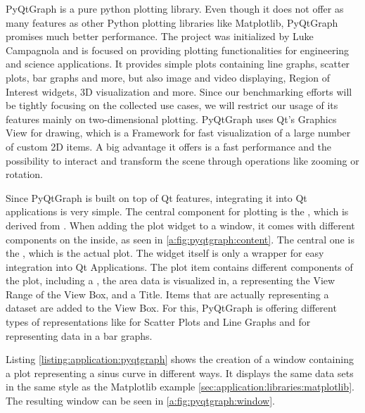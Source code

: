 PyQtGraph is a pure python plotting library. Even though it does not offer as
many features as other Python plotting libraries like Matplotlib, PyQtGraph
promises much better performance. The project was initialized by Luke Campagnola
and is focused on providing plotting functionalities for engineering and science
applications. It provides simple plots containing line graphs, scatter plots,
bar graphs and more, but also image and video displaying, Region of Interest
widgets, 3D visualization and more.  Since our benchmarking efforts will be
tightly focusing on the collected use cases, we will restrict our usage of its
features mainly on two-dimensional plotting. PyQtGraph uses Qt's Graphics View
for drawing, which is a Framework for fast visualization of a large number of
custom 2D items. A big advantage it offers is a fast performance and the
possibility to interact and transform the scene through operations like
zooming or rotation.
\cite{GraphicsView}

Since PyQtGraph is built on top of Qt features, integrating it into Qt
applications is very simple. The central component for plotting is the
, which is derived from
. When adding the plot widget to a
window, it comes with different components on the inside, as seen in
\ref{a:fig:pyqtgraph:content}. The central one is the
, which is the actual plot. The widget
itself is only a wrapper for easy integration into Qt Applications. The plot
item contains different components of the plot, including a
, the area data is visualized in,
a  representing the View Range
of the View Box, and a Title. Items that are actually representing a dataset are
added to the View Box. For this, PyQtGraph is offering different types of
representations like  for Scatter
Plots and Line Graphs and  for
representing data in a bar graphs.

Listing \ref{listing:application:pyqtgraph} shows the creation of a window
containing a plot representing a sinus curve in different ways. It displays the
same data sets in the same style as the Matplotlib example
\ref{sec:application:libraries:matplotlib}. The resulting window can be seen in
\ref{a:fig:pyqtgraph:window}.
\cite{PyQtGraphDoc}




